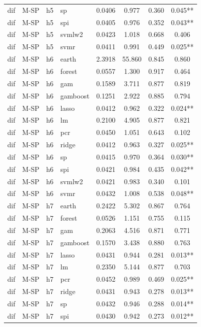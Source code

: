 \begin{ThreePartTable}
\begin{longtable}[t]{llclcccc}
dif & M-SP & h5 & sp & 0.0406 & 0.977 & 0.360 & 0.045**\\
dif & M-SP & h5 & spi & 0.0405 & 0.976 & 0.352 & 0.043**\\
dif & M-SP & h5 & svmlw2 & 0.0423 & 1.018 & 0.668 & 0.406\\
dif & M-SP & h5 & svmr & 0.0411 & 0.991 & 0.449 & 0.025**\\
\addlinespace
dif & M-SP & h6 & earth & 2.3918 & 55.860 & 0.845 & 0.860\\
dif & M-SP & h6 & forest & 0.0557 & 1.300 & 0.917 & 0.464\\
dif & M-SP & h6 & gam & 0.1589 & 3.711 & 0.877 & 0.819\\
dif & M-SP & h6 & gamboost & 0.1251 & 2.922 & 0.885 & 0.794\\
dif & M-SP & h6 & lasso & 0.0412 & 0.962 & 0.322 & 0.024**\\
dif & M-SP & h6 & lm & 0.2100 & 4.905 & 0.877 & 0.821\\
dif & M-SP & h6 & pcr & 0.0450 & 1.051 & 0.643 & 0.102\\
dif & M-SP & h6 & ridge & 0.0412 & 0.963 & 0.327 & 0.025**\\
dif & M-SP & h6 & sp & 0.0415 & 0.970 & 0.364 & 0.030**\\
dif & M-SP & h6 & spi & 0.0421 & 0.984 & 0.435 & 0.042**\\
dif & M-SP & h6 & svmlw2 & 0.0421 & 0.983 & 0.340 & 0.101\\
dif & M-SP & h6 & svmr & 0.0432 & 1.008 & 0.538 & 0.048**\\
\addlinespace
dif & M-SP & h7 & earth & 0.2422 & 5.302 & 0.867 & 0.764\\
dif & M-SP & h7 & forest & 0.0526 & 1.151 & 0.755 & 0.115\\
dif & M-SP & h7 & gam & 0.2063 & 4.516 & 0.871 & 0.771\\
dif & M-SP & h7 & gamboost & 0.1570 & 3.438 & 0.880 & 0.763\\
dif & M-SP & h7 & lasso & 0.0431 & 0.944 & 0.281 & 0.013**\\
dif & M-SP & h7 & lm & 0.2350 & 5.144 & 0.877 & 0.703\\
dif & M-SP & h7 & pcr & 0.0452 & 0.989 & 0.469 & 0.025**\\
dif & M-SP & h7 & ridge & 0.0431 & 0.943 & 0.278 & 0.013**\\
dif & M-SP & h7 & sp & 0.0432 & 0.946 & 0.288 & 0.014**\\
dif & M-SP & h7 & spi & 0.0430 & 0.942 & 0.273 & 0.012**\\

\end{longtable}
\end{ThreePartTable}
